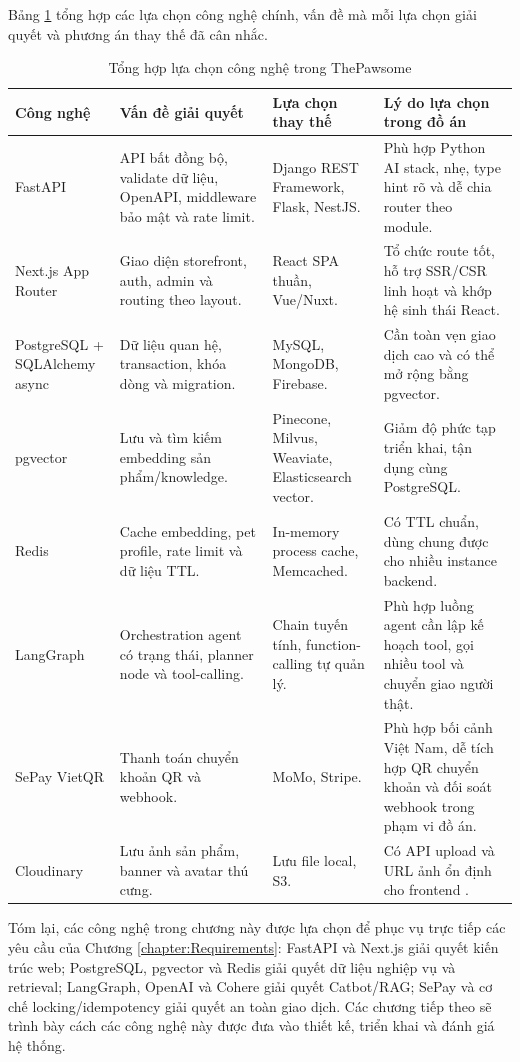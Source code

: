 \documentclass[../DoAn.tex]{subfiles}
\begin{document}
Bảng \ref{table:3.1} tổng hợp các lựa chọn công nghệ chính, vấn đề mà mỗi lựa chọn giải quyết và phương án thay thế đã cân nhắc.

\begin{table}[H]
\centering
\small
\setlength{\tabcolsep}{2pt}
\renewcommand{\arraystretch}{1.25}
\caption{Tổng hợp lựa chọn công nghệ trong ThePawsome}
\label{table:3.1}
\begin{tabularx}{\linewidth}{|>{\raggedright\arraybackslash}p{2.4cm}|>{\raggedright\arraybackslash}X|>{\raggedright\arraybackslash}p{3.0cm}|>{\raggedright\arraybackslash}X|}
\hline
\textbf{Công nghệ} & \textbf{Vấn đề giải quyết} & \textbf{Lựa chọn thay thế} & \textbf{Lý do lựa chọn trong đồ án} \\ \hline
FastAPI & API bất đồng bộ, validate dữ liệu, OpenAPI, middleware bảo mật và rate limit. & Django REST Framework, Flask, NestJS. & Phù hợp Python AI stack, nhẹ, type hint rõ và dễ chia router theo module. \\ \hline
Next.js App Router & Giao diện storefront, auth, admin và routing theo layout. & React SPA thuần, Vue/Nuxt. & Tổ chức route tốt, hỗ trợ SSR/CSR linh hoạt và khớp hệ sinh thái React. \\ \hline
PostgreSQL + SQLAlchemy async & Dữ liệu quan hệ, transaction, khóa dòng và migration. & MySQL, MongoDB, Firebase. & Cần toàn vẹn giao dịch cao và có thể mở rộng bằng pgvector. \\ \hline
pgvector & Lưu và tìm kiếm embedding sản phẩm/knowledge. & Pinecone, Milvus, Weaviate, Elasticsearch vector. & Giảm độ phức tạp triển khai, tận dụng cùng PostgreSQL. \\ \hline
Redis & Cache embedding, pet profile, rate limit và dữ liệu TTL. & In-memory process cache, Memcached. & Có TTL chuẩn, dùng chung được cho nhiều instance backend. \\ \hline
LangGraph & Orchestration agent có trạng thái, planner node và tool-calling. & Chain tuyến tính, function-calling tự quản lý. & Phù hợp luồng agent cần lập kế hoạch tool, gọi nhiều tool và chuyển giao người thật. \\ \hline
SePay VietQR & Thanh toán chuyển khoản QR và webhook. & MoMo, Stripe. & Phù hợp bối cảnh Việt Nam, dễ tích hợp QR chuyển khoản và đối soát webhook trong phạm vi đồ án. \\ \hline
Cloudinary & Lưu ảnh sản phẩm, banner và avatar thú cưng. & Lưu file local, S3. & Có API upload và URL ảnh ổn định cho frontend \cite{cloudinaryUploadDocs}. \\ \hline
\end{tabularx}
\end{table}

Tóm lại, các công nghệ trong chương này được lựa chọn để phục vụ trực tiếp các yêu cầu của Chương \ref{chapter:Requirements}: FastAPI và Next.js giải quyết kiến trúc web; PostgreSQL, pgvector và Redis giải quyết dữ liệu nghiệp vụ và retrieval; LangGraph, OpenAI và Cohere giải quyết Catbot/RAG; SePay và cơ chế locking/idempotency giải quyết an toàn giao dịch. Các chương tiếp theo sẽ trình bày cách các công nghệ này được đưa vào thiết kế, triển khai và đánh giá hệ thống.
\end{document}

